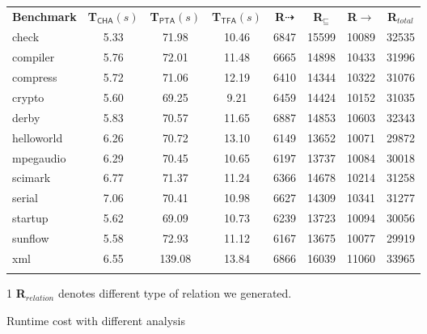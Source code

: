 \documentclass{fac}
\newcommand{\less}{\sqsubseteq}
\newcommand{\tflow}{\dashrightarrow}
\begin{document}
\begin{figure}\centering
\begin{threeparttable}[b]
\begin{tabular}{lccccccc}
	\fullhline
	\textbf{Benchmark} & \hspace{5pt}\textbf{T$_{\textsf{CHA}}(s)$}& \hspace{5pt}\textbf{T$_{\textsf{PTA}}(s)$} & \hspace{5pt}\textbf{T$_{\textsf{TFA}}(s)$} & \hspace{10pt}\textbf{R${\tflow}$}\hspace{10pt} & \hspace{10pt}\textbf{R$_{\less}$}\hspace{10pt} & \hspace{10pt}\textbf{R${\rightarrow}$}\hspace{10pt} &\hspace{10pt}\textbf{R$_{total}$}\hspace{10pt}\\
	\fullhline
check & 5.33 & 71.98 & 10.46 & 6847 & 15599 & 10089 & 32535\\
compiler & 5.76 & 72.01 & 11.48 & 6665 & 14898 & 10433 & 31996\\
compress & 5.72 & 71.06 & 12.19 & 6410 & 14344 & 10322 & 31076\\
crypto & 5.60 & 69.25 & 9.21 & 6459 & 14424 & 10152 & 31035\\
derby & 5.83 & 70.57 & 11.65 & 6887 & 14853 & 10603 & 32343\\
helloworld & 6.26 & 70.72 & 13.10 & 6149 & 13652 & 10071 & 29872\\
mpegaudio & 6.29 & 70.45 & 10.65 & 6197 & 13737 & 10084 & 30018\\
scimark & 6.77 & 71.37 & 11.24 & 6366 & 14678 & 10214 & 31258\\
serial & 7.06 & 70.41 & 10.98 & 6627 & 14309 & 10341 & 31277\\
startup & 5.62 & 69.09 & 10.73 & 6239 & 13723 & 10094 & 30056\\
sunflow & 5.58 & 72.93 & 11.12 & 6167 & 13675 & 10077 & 29919\\
xml & 6.55 & 139.08 & 13.84 & 6866 & 16039 & 11060 & 33965\\
	\fullhline
\end{tabular}
\caption{Runtime cost with different analysis}
\label{fig:TimeCost}
\begin{tablenotes}
  \item[1] \textbf{R}$_{relation}$ denotes different type of relation we generated.
\end{tablenotes}
\end{threeparttable}
\end{figure}
\end{document}
